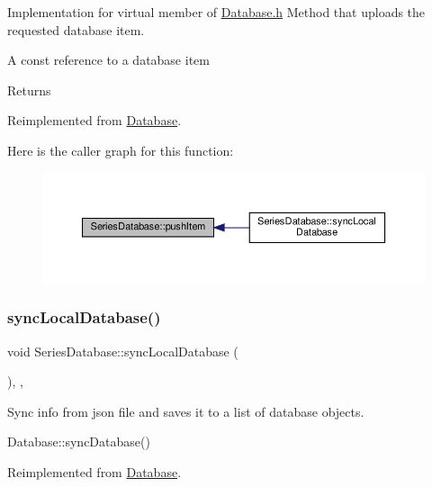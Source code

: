 Implementation for virtual member of \hyperlink{Database_8h_source}{Database.\+h} Method that uploads the requested database item. 

A const reference to a database item

\begin{DoxyReturn}{Returns}

\end{DoxyReturn}


Reimplemented from \hyperlink{classDatabase_a80fa14ab9f4deadc9a2ab7493f1919a4}{Database}.

Here is the caller graph for this function\+:\nopagebreak
\begin{figure}[H]
\begin{center}
\leavevmode
\includegraphics[width=350pt]{classSeriesDatabase_a7591f89ab256d9f5a41235f5552e4e23_icgraph}
\end{center}
\end{figure}
\mbox{\label{classSeriesDatabase_a0ba159b6d52a3cfa07135c7d8b37ef76}} 
\subsubsection{\texorpdfstring{sync\+Local\+Database()}{syncLocalDatabase()}}
{\footnotesize\ttfamily void Series\+Database\+::sync\+Local\+Database (\begin{DoxyParamCaption}{ }\end{DoxyParamCaption})\hspace{0.3cm}{\ttfamily [inline]}, {\ttfamily [override]}, {\ttfamily [virtual]}}



Sync info from json file and saves it to a list of database objects. 

Database\+::sync\+Database() 

Reimplemented from \hyperlink{classDatabase_a14d24487b4ea3b50097b9ac0f2b3f317}{Database}.


